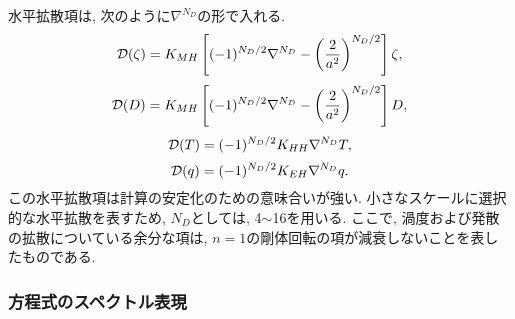 水平拡散項は, 次のように$\nabla^{N_D}$の形で入れる.
%
\begin{equation}
  \label{水平拡散}
  {\cal D}(\zeta) = K_{MH} 
                      \left[ (-1)^{N_D/2} \nabla^{N_D}
                              - \left( \frac{2}{a^2} \right)^{N_D/2} 
                      \right]
                    \zeta ,
\end{equation}
%
\begin{equation}
     {\cal D}(D) = K_{MH} 
                      \left[ (-1)^{N_D/2} \nabla^{N_D}
                              - \left( \frac{2}{a^2} \right)^{N_D/2} 
                      \right]
                    D ,
\end{equation}
%
\begin{equation}
    {\cal D}(T) = (-1)^{N_D/2} K_{HH} \nabla^{N_D} T ,
\end{equation}
%
\begin{equation}
    {\cal D}(q) = (-1)^{N_D/2} K_{EH} \nabla^{N_D} q .
\end{equation}
%
この水平拡散項は計算の安定化のための意味合いが強い.
小さなスケールに選択的な水平拡散を表すため,
$N_D$としては, 4$\sim$16を用いる.
ここで, 渦度および発散の拡散についている余分な項は,
$n=1$の剛体回転の項が減衰しないことを表したものである.

\subsubsection{方程式のスペクトル表現}


